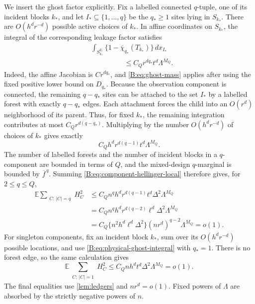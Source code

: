 \documentclass[11pt]{article}
\newcommand{\E}{\mathbb{E}}
\newcommand{\abs}[1]{\lvert #1\rvert}
\begin{document}
We insert the ghost factor explicitly.  Fix a labelled connected
\(q\)-tuple, one of its incident blocks \(k_*\), and let
\(I_*\subseteq\{1,\ldots,q\}\) be the \(q_*\ge1\) sites lying in
\(S_{k_*}\).  There are \(O(h^dr^{-d})\) possible active choices of
\(k_*\).  In affine coordinates on \(S_{k_*}\), the integral of the
corresponding leakage factor satisfies
\begin{align}
 &\int_{S_{k_*}^{q_*}}
   \{1-\overline\chi_{q_*}(T_{k_*})\}
   \,dx_{I_*}
 \nonumber\\
 &\hspace{2cm}\le
 C_Qr^{dq_*}t^d\Lambda^{M_Q}.
 \label{B:eq:physical-ghost-integral}
\end{align}
Indeed, the affine Jacobian is \(C r^{dq_*}\), and
\eqref{B:eq:ghost-mass} applies after using the fixed positive lower bound on
\(D_{q_*}\).  Because the observation component is connected, the remaining
\(q-q_*\) sites can be attached to the set \(I_*\) by a labelled forest with
exactly \(q-q_*\) edges.  Each attachment forces the child into an
\(O(r^d)\) neighborhood of its parent.  Thus, for fixed \(k_*\), the
remaining integration contributes at most \(C_Qr^{d(q-q_*)}\).  Multiplying
by the number \(O(h^dr^{-d})\) of choices of \(k_*\) gives exactly
\[
 C_Qh^dr^{d(q-1)}t^d\Lambda^{M_Q}.
\]
The number of labelled forests and the number of incident blocks in a
\(q\)-component are bounded in terms of \(Q\), and the mixed-design
\(q\)-marginal is bounded by \(\overline f^{\,q}\).  Summing
\eqref{B:eq:component-hellinger-local} therefore gives, for
\(2\le q\le Q\),
\begin{align}
 \E\sum_{\substack{C:\,\abs C=q}}H_C^2
 &\le C_Qn^q h^dr^{d(q-1)}t^d\Delta^2\Lambda^{M_Q}
 \nonumber\\
 &=C_Q n^q h^dr^{d(q-2)}\ell^d\Delta^2\Lambda^{M_Q}
 \nonumber\\
 &=C_Q\{n^2h^d\ell^d\Delta^2\}
       (nr^d)^{q-2}\Lambda^{M_Q}
 =o(1).
 \label{B:eq:low-hellinger}
\end{align}
For singleton components, fix an incident block \(k_*\), sum over its
\(O(h^dr^{-d})\) possible locations, and use
\eqref{B:eq:physical-ghost-integral} with \(q_*=1\).  There is no forest edge,
so the same calculation gives
\begin{equation}
 \E\sum_{\substack{C:\,\abs C=1}}H_C^2
 \le C_Qnh^dt^d\Delta^2\Lambda^{M_Q}=o(1).
 \label{B:eq:single-hellinger}
\end{equation}
The final equalities use \cref{lem:ledgers} and \(nr^d=o(1)\).  Fixed
powers of \(\Lambda\) are absorbed by the strictly negative powers of
\(n\).
\end{document}

